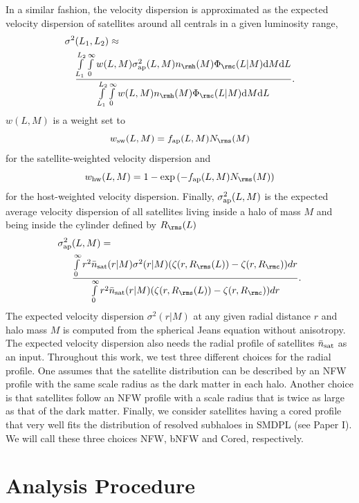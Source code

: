 \documentclass[fleqn,usenatbib,useAMS]{mnras}
\begin{document}
In a similar fashion, the velocity dispersion is approximated as the expected velocity dispersion of satellites around all centrals in a given luminosity range,
\begin{align}
\sigma^2 &(L_1, L_2) \approx \nonumber\\
&\frac{\int\limits_{L_1}^{L_2}\int\limits_0^\infty w (L, M) \sigma^2_{\rm ap} (L, M) n_\rmh (M) \Phi_\rmc (L | M) \mathrm{d}M \mathrm{d}L}{\int\limits_{L_1}^{L_2}\int\limits_0^\infty w (L, M) n_\rmh (M) \Phi_\rmc (L | M) \mathrm{d}M \mathrm{d}L}.
\end{align}
$w (L, M)$ is a weight set to
\begin{equation}
w_{\rm sw} (L, M) = f_{\rm ap} (L, M) N_\rms (M)
\end{equation}
for the satellite-weighted velocity dispersion and
\begin{equation}
w_{\rm hw} (L, M) = 1 - \exp \left( - f_{\rm ap} (L, M) N_\rms (M) \right)
\end{equation}
for the host-weighted velocity dispersion. Finally, $\sigma^2_{\rm ap} (L, M)$ is the expected average velocity dispersion of all satellites living inside a halo of mass $M$ and being inside the cylinder defined by $R_\rms(L)$
\begin{align}
\sigma^2_{\rm ap} & (L, M) = \nonumber\\
&\frac{\int\limits_0^\infty r^2 \bar{n}_{\rm sat} (r | M) \sigma^2 (r | M) (\zeta(r, R_\rms (L)) - \zeta(r, R_\rmc)) dr}{\int\limits_0^\infty r^2 \bar{n}_{\rm sat} (r | M) (\zeta(r, R_\rms (L)) - \zeta(r, R_\rmc)) dr}.
\end{align}
The expected velocity dispersion $\sigma^2 (r | M)$ at any given radial distance $r$ and halo mass $M$ is computed from the spherical Jeans equation without anisotropy. The expected velocity dispersion also needs the radial profile of satellites $\bar{n}_{\rm sat}$ as an input. Throughout this work, we test three different choices for the radial profile. One assumes that the satellite distribution can be described by an NFW profile with the same scale radius as the dark matter in each halo. Another choice is that satellites follow an NFW profile with a scale radius that is twice as large as that of the dark matter. Finally, we consider satellites having a cored profile that very well fits the distribution of resolved subhaloes in SMDPL (see Paper I). We will call these three choices NFW, bNFW and Cored, respectively.

\section{Analysis Procedure}
\label{sec:analysis}
\end{document}
